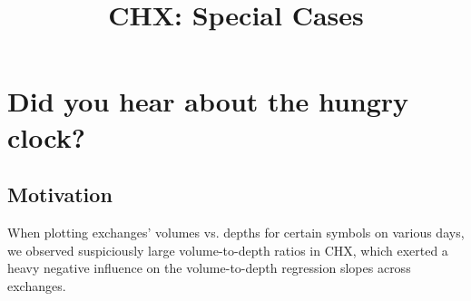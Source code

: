 \documentclass{article}
\begin{document}
\title{CHX: Special Cases}

\maketitle
\vspace{.5pc}

\section{Did you hear about the hungry clock?}
\subsection{Motivation}
When plotting exchanges' volumes vs. depths for certain symbols on various days, we observed suspiciously large volume-to-depth ratios in CHX, which exerted a heavy negative influence on the volume-to-depth regression slopes across exchanges.\\
\end{document}

